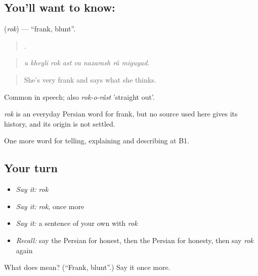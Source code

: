 \subsection*{You'll want to know: }
\textbf{} (\emph{rok}) — \textquotedblleft{}frank, blunt\textquotedblright{}.

\begin{quote}
       .
\end{quote}

\begin{quote}
\emph{u kheyli rok ast va nazarash râ miguyad.}
\end{quote}

\begin{quote}
She's very frank and says what she thinks.
\end{quote}

Common in speech; also \emph{rok-o-râst} 'straight out'.

\begin{cousinweb}
\emph{rok} is an everyday Persian word for frank, but no source used here gives its history, and its origin is not settled.
\end{cousinweb}

\begin{grammarlens}[title={What you've built}]
One more word for telling, explaining and describing at B1.
\end{grammarlens}

\subsection*{Your turn}
\begin{itemize}
\raggedright
  \item \emph{Say it:} \emph{rok}
  \item \emph{Say it:} \emph{rok}, once more
  \item \emph{Say it:} a sentence of your own with \emph{rok}
  \item \emph{Recall:} say the Persian for honest, then the Persian for honesty, then say \emph{rok} again
\end{itemize}

\begin{tcolorbox}[breakable,colback=teal!4,colframe=teal!35!black,title={Before you move on}]
What does  mean? (\textquotedblleft{}Frank, blunt\textquotedblright{}.) Say it once more.
\end{tcolorbox}
